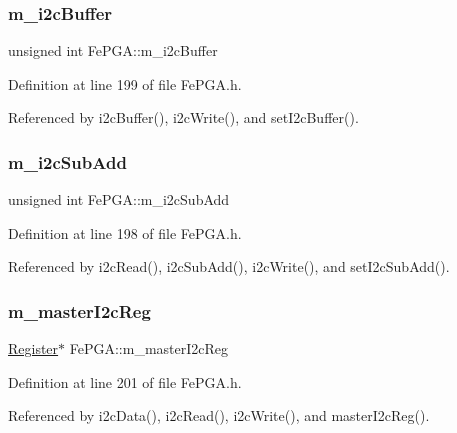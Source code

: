 \subsubsection{\texorpdfstring{m\+\_\+i2c\+Buffer}{m\_i2cBuffer}}
{\footnotesize\ttfamily unsigned int Fe\+P\+G\+A\+::m\+\_\+i2c\+Buffer\hspace{0.3cm}{\ttfamily [private]}}



Definition at line 199 of file Fe\+P\+G\+A.\+h.



Referenced by i2c\+Buffer(), i2c\+Write(), and set\+I2c\+Buffer().

\mbox{\label{classFePGA_aba8c2c8d8e0d136826b9dd4c2d7c2e90}} 
\subsubsection{\texorpdfstring{m\+\_\+i2c\+Sub\+Add}{m\_i2cSubAdd}}
{\footnotesize\ttfamily unsigned int Fe\+P\+G\+A\+::m\+\_\+i2c\+Sub\+Add\hspace{0.3cm}{\ttfamily [private]}}



Definition at line 198 of file Fe\+P\+G\+A.\+h.



Referenced by i2c\+Read(), i2c\+Sub\+Add(), i2c\+Write(), and set\+I2c\+Sub\+Add().

\mbox{\label{classFePGA_adb390ea8de4a6cbce648dc62e4405f32}} 
\subsubsection{\texorpdfstring{m\+\_\+master\+I2c\+Reg}{m\_masterI2cReg}}
{\footnotesize\ttfamily \hyperlink{classRegister}{Register}$\ast$ Fe\+P\+G\+A\+::m\+\_\+master\+I2c\+Reg\hspace{0.3cm}{\ttfamily [private]}}



Definition at line 201 of file Fe\+P\+G\+A.\+h.



Referenced by i2c\+Data(), i2c\+Read(), i2c\+Write(), and master\+I2c\+Reg().

